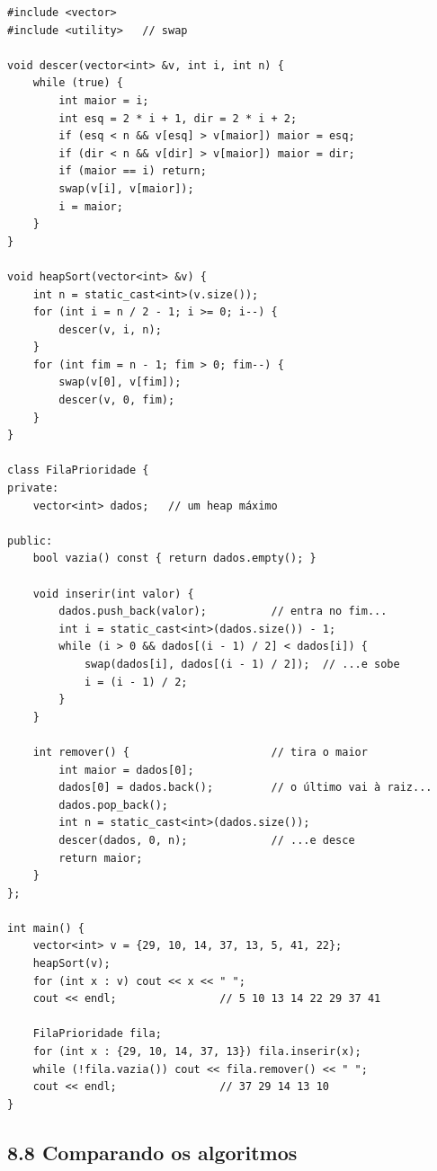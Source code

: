 \begin{codigo}
\begin{Verbatim}[breaklines=true, breaksymbolleft={}, fontsize=\footnotesize]
#include <vector>
#include <utility>   // swap

void descer(vector<int> &v, int i, int n) {
    while (true) {
        int maior = i;
        int esq = 2 * i + 1, dir = 2 * i + 2;
        if (esq < n && v[esq] > v[maior]) maior = esq;
        if (dir < n && v[dir] > v[maior]) maior = dir;
        if (maior == i) return;
        swap(v[i], v[maior]);
        i = maior;
    }
}

void heapSort(vector<int> &v) {
    int n = static_cast<int>(v.size());
    for (int i = n / 2 - 1; i >= 0; i--) {
        descer(v, i, n);
    }
    for (int fim = n - 1; fim > 0; fim--) {
        swap(v[0], v[fim]);
        descer(v, 0, fim);
    }
}

class FilaPrioridade {
private:
    vector<int> dados;   // um heap máximo

public:
    bool vazia() const { return dados.empty(); }

    void inserir(int valor) {
        dados.push_back(valor);          // entra no fim...
        int i = static_cast<int>(dados.size()) - 1;
        while (i > 0 && dados[(i - 1) / 2] < dados[i]) {
            swap(dados[i], dados[(i - 1) / 2]);  // ...e sobe
            i = (i - 1) / 2;
        }
    }

    int remover() {                      // tira o maior
        int maior = dados[0];
        dados[0] = dados.back();         // o último vai à raiz...
        dados.pop_back();
        int n = static_cast<int>(dados.size());
        descer(dados, 0, n);             // ...e desce
        return maior;
    }
};

int main() {
    vector<int> v = {29, 10, 14, 37, 13, 5, 41, 22};
    heapSort(v);
    for (int x : v) cout << x << " ";
    cout << endl;                // 5 10 13 14 22 29 37 41

    FilaPrioridade fila;
    for (int x : {29, 10, 14, 37, 13}) fila.inserir(x);
    while (!fila.vazia()) cout << fila.remover() << " ";
    cout << endl;                // 37 29 14 13 10
}
\end{Verbatim}
\end{codigo}

\subsection{8.8 Comparando os algoritmos}

